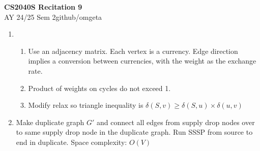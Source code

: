 \documentclass[12pt, a4paper]{article}
\newcommand{\mytitle}{CS2040S Recitation 9}
\newcommand{\myauthor}{github/omgeta}
\newcommand{\mydate}{AY 24/25 Sem 2}
\begin{document}
\raggedright
\footnotesize
\begin{center}
{\normalsize{\textbf{\mytitle}}} \\
{\footnotesize{\mydate\hspace{2pt}\textemdash\hspace{2pt}\myauthor}}
\end{center}
\begin{enumerate}[Q\arabic*.]
  \item 
    \begin{enumerate}[(\alph*.)]
      \item Use an adjacency matrix. Each vertex is a currency. Edge direction implies a conversion between currencies, with the weight as the exchange rate.

      \item Product of weights on cycles do not exceed 1.

      \item Modify relax so triangle inequality is $\delta(S,v) \geq \delta(S, u) \times \delta(u,v)$ 
    \end{enumerate}

  \item Make duplicate graph $G'$ and connect all edges from supply drop nodes over to same supply drop node in the duplicate graph. Run SSSP from source to end in duplicate. Space complexity: $O(V)$
\end{enumerate}
\end{document}

